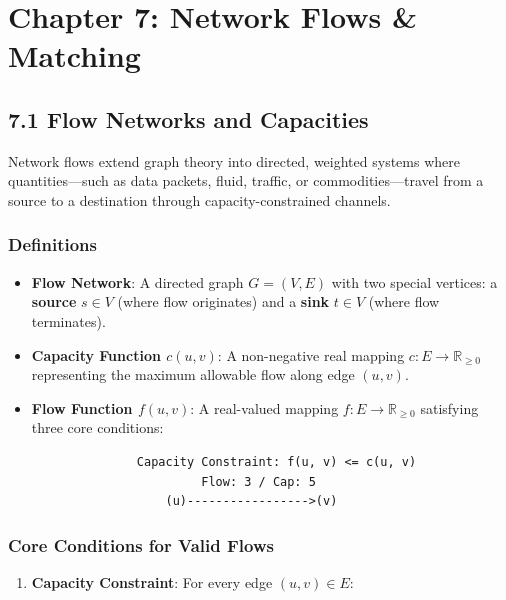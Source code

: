 \documentclass[
]{book}
\providecommand{\tightlist}{%
  \setlength{\itemsep}{0pt}\setlength{\parskip}{0pt}}
\theoremstyle{definition}
\theoremstyle{definition}
\theoremstyle{definition}
\theoremstyle{definition}
\theoremstyle{remark}
\begin{document}
\chapter{Chapter 7: Network Flows \& Matching}\label{chapter-7-network-flows-matching}

\section{7.1 Flow Networks and Capacities}\label{flow-networks-and-capacities}

Network flows extend graph theory into directed, weighted systems where quantities---such as data packets, fluid, traffic, or commodities---travel from a source to a destination through capacity-constrained channels.

\subsection{Definitions}\label{definitions-5}

\begin{itemize}
\tightlist
\item
  \textbf{Flow Network}: A directed graph \(G = (V, E)\) with two special vertices: a \textbf{source} \(s \in V\) (where flow originates) and a \textbf{sink} \(t \in V\) (where flow terminates).
\item
  \textbf{Capacity Function \(c(u, v)\)}: A non-negative real mapping \(c: E \to \mathbb{R}_{\ge 0}\) representing the maximum allowable flow along edge \((u, v)\).
\item
  \textbf{Flow Function \(f(u, v)\)}: A real-valued mapping \(f: E \to \mathbb{R}_{\ge 0}\) satisfying three core conditions:
\end{itemize}

\begin{verbatim}
                  Capacity Constraint: f(u, v) <= c(u, v)
                           Flow: 3 / Cap: 5
                      (u)----------------->(v)
\end{verbatim}

\subsection{Core Conditions for Valid Flows}\label{core-conditions-for-valid-flows}

\begin{enumerate}
\def\labelenumi{\arabic{enumi}.}
\tightlist
\item
  \textbf{Capacity Constraint}: For every edge \((u, v) \in E\):
\end{enumerate}
\end{document}
